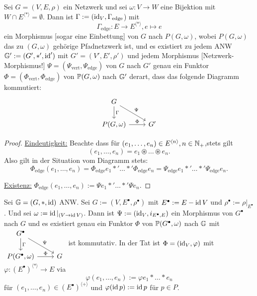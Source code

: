 \begin{proposition}
    Sei $G=(V,E,\rho)$ ein Netzwerk und sei $\omega: V \to W$ eine Bijektion mit $W \cap E^{\langle\ast\rangle} = \emptyset$.
    Dann ist $\Gamma := (\id_V, \Gamma_{\text{edge}}$) mit 
    $$ \Gamma_{\text{edge}}: E \to E^{\langle\ast\rangle}, e \mapsto e $$ ein Morphismus [sogar eine Einbettung] von $G$ nach $P(G,\omega)$, wobei
    $P(G,\omega)$ das zu $(G,\omega)$ gehörige Pfadnetzwerk ist, und es existiert zu jedem ANW $\G':=(G',\ast',\id')$ mit
    $G'=(V',E',\rho')$ und jedem Morphismus [Netzwerk-Morphismus!]
    $ \Psi = (\Psi_{\text{vert}}, \Psi_{\text{edge}})$ von $G$ nach $G'$ genau ein Funktor $\Phi=(\Phi_{\text{vert}},\Phi_{\text{edge}})$ von 
    $\P(G,\omega)$ nach $\G'$ derart, dass das folgende Diagramm kommutiert:
    $$ \begin{tikzcd}
        \dar{\Gamma}G\drar{\Psi} &\\
        P(G,\omega) \rar{\Phi} & G'
    \end{tikzcd}$$
\end{proposition}
\begin{proof}
    \underline{Eindeutigkeit:} Beachte dass für $(e_1,\ldots,e_n) \in E^{\langle n\rangle}, n \in \N_+$,stets gilt
    $$  (e_1,\ldots, e_n) = e_1 \circledast \ldots \circledast e_n.$$
    Also gilt in der Situation vom Diagramm stets:
    $$ \Phi_{\text{edge}}(e_1, \ldots, e_n) = \Phi_{\text{edge}}e_1 \ast' \ldots \ast' \Phi_{\text{edge}}e_n = \Psi_{\text{edge}}e_1 \ast' \ldots \ast' \Psi_{\text{edge}} e_n.$$

    \underline{Existenz:} $ \Phi_{\text{edge}}(e_1,\ldots,e_n) := \Psi e_1 \ast' \ldots \ast' \Psi e_n$.
\end{proof}

\begin{bemerkung}
    Sei $\G = (G, \ast, \id)$ ANW. Sei $G := (V, E^\bullet, \rho^\bullet)$ mit $E^\bullet := E - \id V$ und
    $\rho^\bullet := \rho|_{E^\bullet}$. Und sei $\omega := \id|_{(V \to \id V)}$. Dann ist $\Psi:= (\id_V, i_{E^\bullet,E})$ ein 
    Morphismus von $G^\bullet$ nach $G$ und es existiert genau ein Funktor $\Phi$ von $\P(G^\bullet, \omega)$ nach $\G$ mit
    $\begin{tikzcd}
        G^\bullet \dar{\Gamma} \drar{\Psi}\\
        P(G^\bullet,\omega) \rar{\Phi} & G
    \end{tikzcd}$ ist kommutativ. In der Tat ist $\Phi=(\id_V, \varphi)$ mit $\varphi:(E^\bullet)^{\langle\ast\rangle} \to E$
    via $$\varphi(e_1, \ldots, e_n) := \varphi e_1 \ast \ldots \ast e_n$$
    für $(e_1, \ldots, e_n) \in (E^\bullet)^{\langle +\rangle}$ und $\varphi(\id p):= \id p$ für $p \in P$.
\end{bemerkung}

